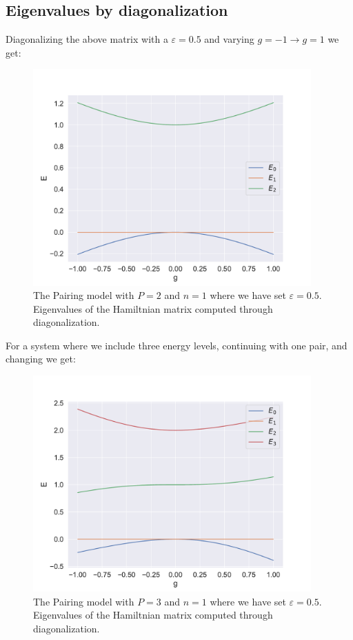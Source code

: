 \subsection{Eigenvalues by diagonalization}

Diagonalizing the above matrix with a $\varepsilon = 0.5$ and varying $g=-1 \rightarrow g=1$ we get:
\begin{figure}[H]
  \begin{center}
    \includegraphics[width=0.95\textwidth]{Figures/Plots/Pairing/pairing_eps05_P2N1}
  \end{center}
  \caption{The Pairing model with $P = 2$ and $n=1$ where we have set $\varepsilon = 0.5$. Eigenvalues of the Hamiltnian matrix computed through diagonalization.}
\end{figure}
For a system where we include three energy levels, continuing with one pair, and changing we get:

\begin{figure}[H]
  \begin{center}
    \includegraphics[width=0.95\textwidth]{Figures/Plots/Pairing/pairing_eps05_P3N1}
  \end{center}
  \caption{The Pairing model with $P = 3$ and $n=1$ where we have set $\varepsilon = 0.5$. Eigenvalues of the Hamiltnian matrix computed through diagonalization.}
\end{figure}



